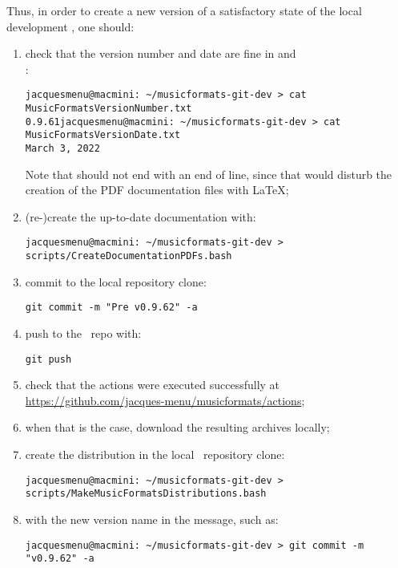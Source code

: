 Thus, in order to create a new version of a satisfactory state of the local development \repo, one should:
\begin{enumerate}
\item check that the version number and date are fine in  and \\:
\begin{lstlisting}[language=TerminalSmall]
jacquesmenu@macmini: ~/musicformats-git-dev > cat MusicFormatsVersionNumber.txt
0.9.61jacquesmenu@macmini: ~/musicformats-git-dev > cat MusicFormatsVersionDate.txt
March 3, 2022
\end{lstlisting}
Note that  should not end with an end of line, since that would disturb the creation of the PDF documentation files with \LaTeX;

\item (re-)create the up-to-date documentation with:
\begin{lstlisting}[language=TerminalSmall]
jacquesmenu@macmini: ~/musicformats-git-dev > scripts/CreateDocumentationPDFs.bash
\end{lstlisting}

\item commit to the local repository clone:
\begin{lstlisting}[language=Terminal]
git commit -m "Pre v0.9.62" -a
\end{lstlisting}

\item push to the \mf\ repo with:
\begin{lstlisting}[language=Terminal]
git push
\end{lstlisting}

\item check that the actions were executed successfully at \url{https://github.com/jacques-menu/musicformats/actions};

\item when that is the case, download the resulting  archives locally;

\item create the distribution in the local \mf\ repository clone:
\begin{lstlisting}[language=Terminal]
jacquesmenu@macmini: ~/musicformats-git-dev > scripts/MakeMusicFormatsDistributions.bash
\end{lstlisting}

\item {} with the new version name in the  message, such as:
\begin{lstlisting}[language=Terminal]
jacquesmenu@macmini: ~/musicformats-git-dev > git commit -m "v0.9.62" -a


\end{lstlisting}
\end{enumerate}
